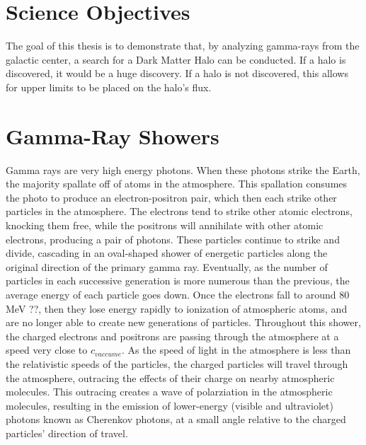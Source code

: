 \section{Science Objectives}
The goal of this thesis is to demonstrate that, by analyzing gamma-rays from the galactic center, a search for a Dark Matter Halo can be conducted.
If a halo is discovered, it would be a huge discovery.
If a halo is not discovered, this allows for upper limits to be placed on the halo's flux.

\section{Gamma-Ray Showers}
Gamma rays are very high energy photons.
When these photons strike the Earth, the majority spallate off of atoms in the atmosphere.
This spallation consumes the photo to produce an electron-positron pair, which then each strike other particles in the atmosphere.
The electrons tend to strike other atomic electrons, knocking them free, while the positrons will annihilate with other atomic electrons, producing a pair of photons.
These particles continue to strike and divide, cascading in an oval-shaped shower of energetic particles along the original direction of the primary gamma ray.
Eventually, as the number of particles in each successive generation is more numerous than the previous, the average energy of each particle goes down.
Once the electrons fall to around 80 MeV ??, then they lose energy rapidly to ionization of atmospheric atoms, and are no longer able to create new generations of particles.
Throughout this shower, the charged electrons and positrons are passing through the atmosphere at a speed very close to $c_{vaccume}$.
As the speed of light in the atmosphere is less than the relativistic speeds of the particles, the charged particles will travel through the atmosphere, outracing the effects of their charge on nearby atmospheric molecules.
This outracing creates a wave of polarziation in the atmospheric molecules, resulting in the emission of lower-energy (visible and ultraviolet) photons known as Cherenkov photons, at a small angle relative to the charged particles' direction of travel.

